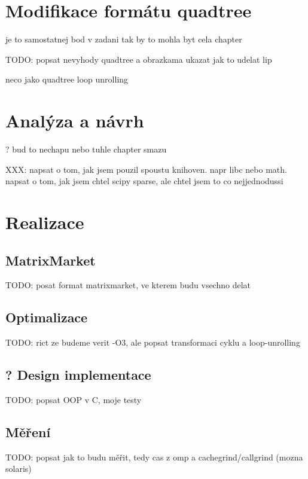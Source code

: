 \documentclass[thesis=B,czech]{FITthesis}[2012/06/26]
\begin{document}

\chapter{Modifikace formátu quadtree}

je to samostatnej bod v zadani tak by to mohla byt cela chapter

TODO: popsat nevyhody quadtree a obrazkama ukazat jak to udelat lip

neco jako quadtree loop unrolling


\chapter{Analýza a návrh}

? bud to nechapu nebo tuhle chapter smazu

XXX: napsat o tom, jak jsem pouzil spoustu knihoven. napr libc nebo math.
napsat o tom, jak jsem chtel scipy sparse, ale chtel jsem to co nejjednodussi

\chapter{Realizace}

\section{MatrixMarket}

TODO: posat format matrixmarket, ve kterem budu vsechno delat

\section{Optimalizace}

TODO: rict ze budeme verit -O3, ale popsat transformaci cyklu a loop-unrolling

\section{? Design implementace}

TODO: popsat OOP v C, moje testy

\section{Měření}

TODO: popsat jak to budu měřit, tedy cas z omp a cachegrind/callgrind (mozna solaris)
\end{document}

